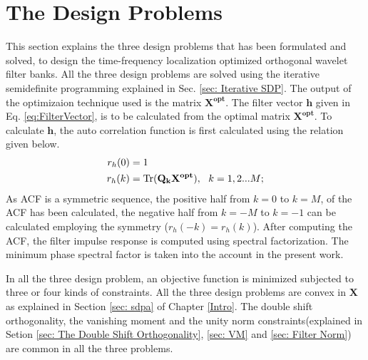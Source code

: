 \section{The Design Problems}
\label{sec: The Different Design Problems}
This section explains the three design problems that has been formulated and solved, to design the time-frequency localization optimized orthogonal wavelet filter banks. All the three design problems are solved using the iterative semidefinite programming explained in Sec. \ref{sec: Iterative SDP}. The output of the optimizaion technique used is the matrix $\mathbf{X^{opt}}$. The filter vector $\mathbf{h}$ given in Eq. \ref{eq:FilterVector}, is to be calculated from the optimal matrix $\mathbf{X^{opt}}$. To calculate $\mathbf{h}$, the auto correlation function is first calculated using the relation given below.  
\begin{eqnarray}
\label{eq: ACF from Xopt}
\begin{aligned}
	r_h(0) &= 1\\
	r_h(k) &= \operatorname{Tr}(\mathbf{Q_k{X^{opt}}}),\,\,\,\,k=1,2...M;
\end{aligned}
\end{eqnarray}
As ACF is a symmetric sequence, the positive half from $k=0$ to $k=M$, of the ACF has been calculated, the negative half from $k=-M$ to $k=-1$ can be calculated employing the symmetry ($r_h(-k) = r_h(k)$). After computing the ACF, the filter impulse response is computed using spectral factorization. The minimum phase spectral factor is taken into the account in the present work.

In all the three design problem, an objective function is minimized subjected to three or four kinds of constraints. All the three design problems are convex in $\mathbf{X}$ as explained in Section \ref{sec: sdpa} of Chapter \ref{Intro}. The double shift orthogonality, the vanishing moment and the unity norm constraints(explained in Setion \ref{sec: The Double Shift Orthogonality}, \ref{sec: VM} and \ref{sec: Filter Norm}) are common in all the three problems. 
